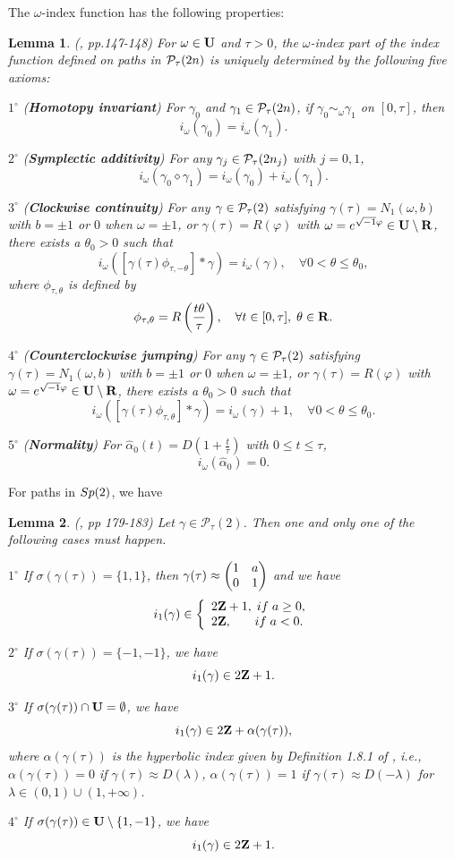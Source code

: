 \documentclass[11pt]{article}
\newtheorem{lemma}{Lemma}[section]
\def\bs{\setminus}
\def\R{{\bf R}}
\def\Z{{\bf Z}}
\def\U{{\bf U}}
\def\aa{{\alpha}}
\def\ga{{\gamma}}
\def\th{{\theta}}
\def\om{{\omega}}
\def\lm{{\lambda}}
\def\sg{{\sigma}}
\def\vf{{\varphi}}
\def\P{{\cal P}}
\def\Sp{{\rm Sp}}
\begin{document}
The $\omega$-index function has the following properties:

\begin{lemma} (\cite{Lon4}, pp.147-148)
For $\omega\in\U$ and $\tau>0$, the $\omega$-index part of the index function defined on paths
in $\P_\tau(2n)$ is uniquely determined by the following five axioms:

$1^\circ$ ({\bf Homotopy invariant}) For $\gamma_0$ and $\gamma_1\in\P_\tau(2n)$,
if $\gamma_0\sim_\omega\gamma_1$ on $[0,\tau]$, then
$$ i_\omega(\gamma_0)=i_\omega(\gamma_1). $$

$2^\circ$ ({\bf Symplectic additivity}) For any $\gamma_j\in\P_\tau(2n_j)$ with $j=0,1$,
$$ i_\omega(\gamma_0\diamond\gamma_1) = i_\omega(\gamma_0)+i_\omega(\gamma_1). $$

$3^\circ$ ({\bf Clockwise continuity}) For any $\ga\in\P_\tau(2)$ satisfying $\ga(\tau)=N_1(\om,b)$
with $b=\pm 1$ or $0$ when $\omega=\pm 1$, or $\ga(\tau)=R(\vf)$ with $\om=e^{\sqrt{-1}\vf}\in \U\bs\R$,
there exists a $\th_0>0$ such that
$$ i_{\om}([\ga(\tau)\phi_{\tau,-\th}]*\ga) = i_{\om}(\ga),\quad\forall 0<\theta\le\th_0, $$
where $\phi_{\tau,\th}$ is defined by
$$ \phi_{\tau,\th}=R\left(\frac{t\th}{\tau}\right),\quad\forall t\in [0,\tau],\;\th\in\R. $$

$4^\circ$ ({\bf Counterclockwise jumping}) For any $\ga\in\P_\tau(2)$ satisfying $\ga(\tau)=N_1(\om,b)$
with $b=\pm 1$ or $0$ when $\om=\pm 1$, or $\ga(\tau)=R(\vf)$ with $\om=e^{\sqrt{-1}\vf}\in \U\bs\R$,
there exists a $\th_0>0$ such that
$$ i_{\om}([\ga(\tau)\phi_{\tau,\th}]*\ga) = i_{\om}(\ga)+1,\quad\forall 0<\th\le\th_0. $$

$5^\circ$ ({\bf Normality}) For $\hat{\aa}_0(t)=D\left(1+\frac{t}{\tau}\right)$ with $0\le t\le \tau$,
$$ i_{\om}(\hat{\aa}_0)=0. $$
\end{lemma}

For paths in $\Sp(2)$, we have

\begin{lemma} (\cite{Lon4}, pp 179-183)
Let $\ga\in\mathcal{P}_\tau(2)$. Then one and only one of the following cases must happen.

$1^\circ$ If $\sg(\ga(\tau))=\{1,1\}$, then $\ga(\tau)\approx\left(\begin{matrix}1 & a\cr 0 & 1\end{matrix}\right)$
and we have
$$i_1(\ga)\in\left\{
\begin{array}{l}
    2\Z+1,{\rm\;if\;} a\ge0,\\
    2\Z,\quad\;\;{\rm\;if\;} a<0.
\end{array}\right.
$$

$2^\circ$ If $\sg(\ga(\tau))=\{-1,-1\}$, we have
$$ i_1(\ga)\in2\Z+1. $$

$3^\circ$ If $\sg(\ga(\tau))\cap\U=\emptyset$, we have
$$ i_1(\ga)\in 2\Z+\aa(\ga(\tau)), $$
where $\aa(\ga(\tau))$ is the hyperbolic index given by Definition 1.8.1 of \cite{Lon4},
i.e., $\aa(\ga(\tau))=0$ if $\ga(\tau)\approx D(\lm)$, $\aa(\ga(\tau))=1$ if $\ga(\tau)\approx D(-\lm)$
for $\lm\in(0,1)\cup (1,+\infty)$.

$4^\circ$ If $\sg(\ga(\tau))\in\U\bs\{1,-1\}$, we have
$$ i_1(\ga)\in 2\Z+1. $$
\end{lemma}
\end{document}
